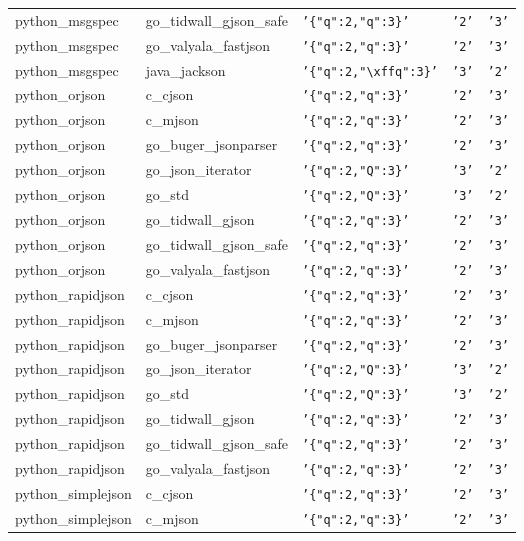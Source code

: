 \documentclass[english, 12pt, a4paper, sci, utf8, a-2b, online]{aaltothesis}
\def\str#1{\texttt{'#1'}}
\begin{document}
\begin{longtable}{lllll}
    python\_msgspec & go\_tidwall\_gjson\_safe & \str{\{"q":2,"q":3\}} & \str{2} & \str{3} \\
    python\_msgspec & go\_valyala\_fastjson & \str{\{"q":2,"q":3\}} & \str{2} & \str{3} \\
    python\_msgspec & java\_jackson & \str{\{"q":2,"\textbackslash xffq":3\}} & \str{3} & \str{2} \\
    python\_orjson & c\_cjson & \str{\{"q":2,"q":3\}} & \str{2} & \str{3} \\
    python\_orjson & c\_mjson & \str{\{"q":2,"q":3\}} & \str{2} & \str{3} \\
    python\_orjson & go\_buger\_jsonparser & \str{\{"q":2,"q":3\}} & \str{2} & \str{3} \\
    python\_orjson & go\_json\_iterator & \str{\{"q":2,"Q":3\}} & \str{3} & \str{2} \\
    python\_orjson & go\_std & \str{\{"q":2,"Q":3\}} & \str{3} & \str{2} \\
    python\_orjson & go\_tidwall\_gjson & \str{\{"q":2,"q":3\}} & \str{2} & \str{3} \\
    python\_orjson & go\_tidwall\_gjson\_safe & \str{\{"q":2,"q":3\}} & \str{2} & \str{3} \\
    python\_orjson & go\_valyala\_fastjson & \str{\{"q":2,"q":3\}} & \str{2} & \str{3} \\
    python\_rapidjson & c\_cjson & \str{\{"q":2,"q":3\}} & \str{2} & \str{3} \\
    python\_rapidjson & c\_mjson & \str{\{"q":2,"q":3\}} & \str{2} & \str{3} \\
    python\_rapidjson & go\_buger\_jsonparser & \str{\{"q":2,"q":3\}} & \str{2} & \str{3} \\
    python\_rapidjson & go\_json\_iterator & \str{\{"q":2,"Q":3\}} & \str{3} & \str{2} \\
    python\_rapidjson & go\_std & \str{\{"q":2,"Q":3\}} & \str{3} & \str{2} \\
    python\_rapidjson & go\_tidwall\_gjson & \str{\{"q":2,"q":3\}} & \str{2} & \str{3} \\
    python\_rapidjson & go\_tidwall\_gjson\_safe & \str{\{"q":2,"q":3\}} & \str{2} & \str{3} \\
    python\_rapidjson & go\_valyala\_fastjson & \str{\{"q":2,"q":3\}} & \str{2} & \str{3} \\
    python\_simplejson & c\_cjson & \str{\{"q":2,"q":3\}} & \str{2} & \str{3} \\
    python\_simplejson & c\_mjson & \str{\{"q":2,"q":3\}} & \str{2} & \str{3} \\

\end{longtable}
\end{document}
